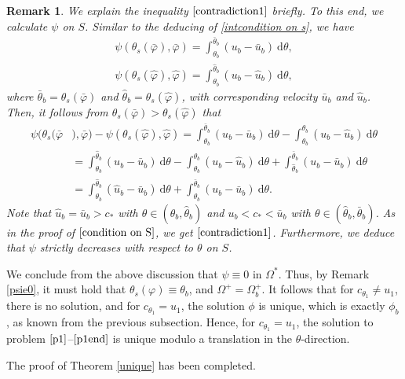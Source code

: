 \documentclass[reqno,12pt]{amsart}
\newcommand{\dd}{\mathrm{d}}
\newtheorem{remark}{Remark}[section]
\numberwithin{equation}{section}
\begin{document}
\begin{remark} \label{rem24}%
	We explain the inequality $\eqref{contradiction1}$ briefly. To this end, we calculate $\psi$ on $S$. Similar to the deducing of  \eqref{intcondition on s}, we have 	
	\begin{align*}
		\psi(\theta_{s}(\bar{\varphi}),\bar{\varphi})=\int^{\bar{\theta}_b}_{\theta_b}(u_b-\bar{u}_b)~\dd\theta,\\
		\psi(\theta_s(\hat{\varphi}),\hat{\varphi})=\int^{\hat{\theta}_b}_{\theta_b}(u_b-\hat{u}_b)~\dd\theta,
	\end{align*}
	where $\bar{\theta}_b=\theta_s(\bar{\varphi})$ and $\hat{\theta}_b=\theta_s(\hat{\varphi})$, with corresponding velocity $\bar{u}_b$ and  $\hat{u}_b$. Then, it follows from $\theta_{s}(\bar{\varphi})>\theta_s(\hat{\varphi})$ that
	\begin{align*}
		\psi(\theta_{s}(\bar{\varphi}&),\bar{\varphi})-\psi(\theta_s(\hat{\varphi}),\hat{\varphi})=\int^{\bar{\theta}_b}_{\theta_b}(u_b-\bar{u}_b)~\dd\theta-\int^{\hat{\theta}_b}_{\theta_b}(u_b-\hat{u}_b)~\dd\theta\\
		&=\int^{\hat{\theta}_b}_{\theta_b}(u_b-\bar{u}_b)~\dd\theta-\int^{\hat{\theta}_b}_{\theta_b}(u_b-\hat{u}_b)~\dd\theta +\int^{\bar{\theta}_b}_{\hat{\theta}_b}(u_b-\bar{u}_b)~\dd\theta\\
		&=\int^{\hat{\theta}_b}_{\theta_b}(\hat{u}_b-\bar{u}_b)~\dd\theta+\int^{\bar{\theta}_b}_{\hat{\theta}_b}(u_b-\bar{u}_b)~\dd\theta.
	\end{align*}
	Note that $\hat{u}_b=\bar{u}_b>c_*$ with $\theta\in(\theta_b,\hat{\theta}_b)$ and $u_b<c_*<\bar{u}_b$ with $\theta\in(\hat{\theta}_b,\bar{\theta}_b)$. As in the proof of $\eqref{condition on S}$, we get $\eqref{contradiction1}$. Furthermore, we deduce that $\psi$  strictly decreases with respect to $\theta$ on $S$.
\end{remark}

We conclude from the above discussion that $\psi\equiv 0$ in $\Omega^*$. Thus, by Remark \ref{psie0}, it must hold that $\theta_s(\varphi)\equiv \theta_b$, and $\Omega^+=\Omega_b^+$. It follows that for $c_{\theta_1}\neq u_1$, there is no solution, and for $c_{\theta_1}= u_1$, the solution $\phi$ is unique, which is exactly $\phi_b$, as known from the previous subsection. Hence, for $c_{\theta_1}= u_1$, the solution to problem $\eqref{p1}$--$\eqref{p1end}$ is unique modulo a translation in the $\theta$-direction.

The proof of Theorem \ref{unique} has been completed.
\end{document}
